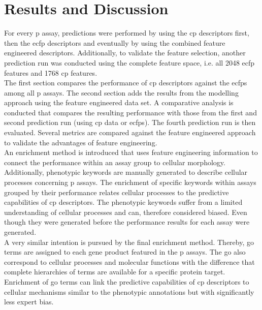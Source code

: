 \chapter{Results and Discussion}\label{sec:results}
For every \acl{p} assay, predictions were performed by using the \ac{cp} descriptors first, then the \ac{ecfp} descriptors and eventually by using the combined feature engineered descriptors. Additionally, to validate the feature selection, another prediction run was conducted using the complete feature space, i.e. all 2048 \ac{ecfp} features and 1768 \ac{cp} features.\\
The first section compares the performance of \ac{cp} descriptors against the \acp{ecfp} among all \ac{p} assays. The second section adds the results from the modelling approach using the feature engineered data set. A comparative analysis is conducted that compares the resulting performance with those from the first and second prediction run (using \ac{cp} data or \acp{ecfp}). The fourth prediction run is then evaluated. Several metrics are compared against the feature engineered approach to validate the advantages of feature engineering.\\
An enrichment method is introduced that uses feature engineering information to connect the performance within an assay group to cellular morphology. Additionally, phenotypic keywords are manually generated to describe cellular processes concerning \ac{p} assays. The enrichment of specific keywords within assays grouped by their performance relates cellular processes to the predictive capabilities of \ac{cp} descriptors. The phenotypic keywords suffer from a limited understanding of cellular processes and can, therefore considered biased. Even though they were generated before the performance results for each assay were generated.\\
A very similar intention is pursued by the final enrichment method. Thereby, \ac{go} terms are assigned to each gene product featured in the \ac{p} assays. The \ac{go} also correspond to cellular processes and molecular functions with the difference that complete hierarchies of terms are available for a specific protein target. Enrichment of \ac{go} terms can link the predictive capabilities of \ac{cp} descriptors to cellular mechanisms similar to the phenotypic annotations but with significantly less expert bias.
